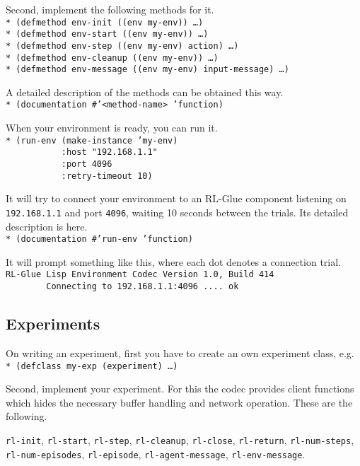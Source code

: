 \documentclass[11pt,a4paper,dvipdfm]{article}
\newcommand{\prompttext}[1]{\texttt{#1}}
\newcommand{\lispprompt}[1]{\prompttext{* #1}}
\begin{document}
Second, implement the following methods for it. \\
\lispprompt{(defmethod env-init ((env my-env)) \ldots)} \\
\lispprompt{(defmethod env-start ((env my-env)) \ldots)} \\
\lispprompt{(defmethod env-step ((env my-env) action) \ldots)} \\
\lispprompt{(defmethod env-cleanup ((env my-env)) \ldots)} \\
\lispprompt{(defmethod env-message ((env my-env) input-message) \ldots)}

A detailed description of the methods can be obtained this way. \\
\lispprompt{(documentation \#'<method-name> 'function)}

When your environment is ready, you can run it. \\
\lispprompt{(run-env (make-instance 'my-env) \\
\mbox{~~~~~~~~~~~}:host "192.168.1.1" \\
\mbox{~~~~~~~~~~~}:port 4096 \\
\mbox{~~~~~~~~~~~}:retry-timeout 10)}

It will try to connect your environment to an RL-Glue component listening on
\prompttext{192.168.1.1} and port \prompttext{4096}, waiting 10 seconds
between the trials. Its detailed description is here. \\
\lispprompt{(documentation \#'run-env 'function)}

It will prompt something like this, where each dot denotes a connection
trial. \\
\prompttext{RL-Glue Lisp Environment Codec Version 1.0, Build 414} \\
\prompttext{\mbox{~~~~~~~~}Connecting to 192.168.1.1:4096 ....~ok}

\subsection{Experiments}

On writing an experiment, first you have to create an own experiment class,
e.g. \\
\lispprompt{(defclass my-exp (experiment) \ldots)}

Second, implement your experiment. For this the codec provides client
functions which hides the necessary buffer handling and network operation.
These are the following.

\prompttext{rl-init},
\prompttext{rl-start},
\prompttext{rl-step},
\prompttext{rl-cleanup},
\prompttext{rl-close},
\prompttext{rl-return},
\prompttext{rl-num-steps}, \\
\prompttext{rl-num-episodes},
\prompttext{rl-episode},
\prompttext{rl-agent-message},
\prompttext{rl-env-message}.
\end{document}
